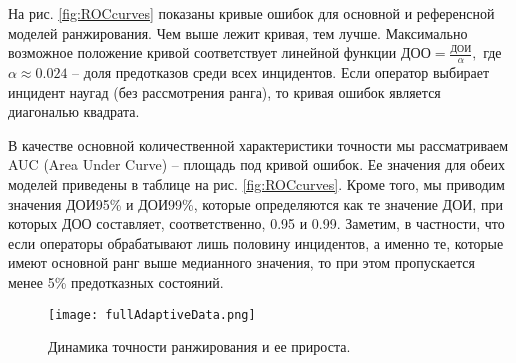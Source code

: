 На рис. \ref{fig:ROCcurves} показаны кривые ошибок для основной и референсной моделей ранжирования. Чем выше лежит кривая, тем лучше. Максимально возможное положение кривой соответствует линейной функции $\text{ДОО}=\frac{ДОИ}{\alpha},$ где $\alpha\approx 0.024$ -- доля предотказов среди всех инцидентов. Если оператор выбирает инцидент наугад (без рассмотрения ранга), то кривая ошибок является диагональю квадрата.

В качестве основной количественной характеристики точности мы рассматриваем AUC (Area Under Curve) -- площадь под кривой ошибок. Ее значения для обеих моделей приведены в таблице на рис. \ref{fig:ROCcurves}. Кроме того, мы приводим значения ДОИ95\% и ДОИ99\%, которые определяются как те значение ДОИ, при которых ДОО составляет, соответственно, 0.95 и 0.99. Заметим, в частности, что если операторы обрабатывают лишь половину инцидентов, а именно те, которые имеют основной ранг выше медианного значения, то при этом пропускается менее 5\% предотказных состояний.


\begin{figure}[thpb] 
\caption{Динамика точности ранжирования и ее прироста.}
\label{fig:adaptiveAdditionScores}
\texttt{[image: fullAdaptiveData.png]}
\end{figure}


